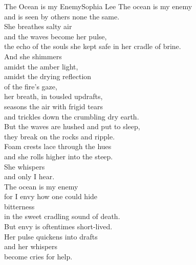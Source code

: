 
\begin{poetry}{The Ocean is my Enemy}{Sophia Lee}
The ocean is my enemy\\
\tab{}and is seen by others none the same.\\
She breathes salty air\\
\tab{}and the waves become her pulse,\\
the echo of the souls she kept safe in her cradle of brine.\\

And she shimmers\\
\tab{}amidst the amber light,\\
amidst the drying reflection\\
\tab{}of the fire's gaze,\\
her breath, in tousled updrafts,\\
\tab{}seasons the air with frigid tears\\
and trickles down the crumbling dry earth.\\


But the waves are hushed and put to sleep,\\
\tab{}they break on the rocks and ripple.\\
Foam crests lace through the hues\\
\tab{}and she rolls higher into the steep.\\
She whispers\\
\tab{}and only I hear.\\

The ocean is my enemy\\
\tab{}for I envy how one could hide\\
bitterness\\
\tab{}in the sweet cradling sound of death.\\
But envy is oftentimes short-lived.\\
\tab{}Her pulse quickens into drafts\\
and her whispers\\
\tab{}become cries for help.\\

\end{poetry}

